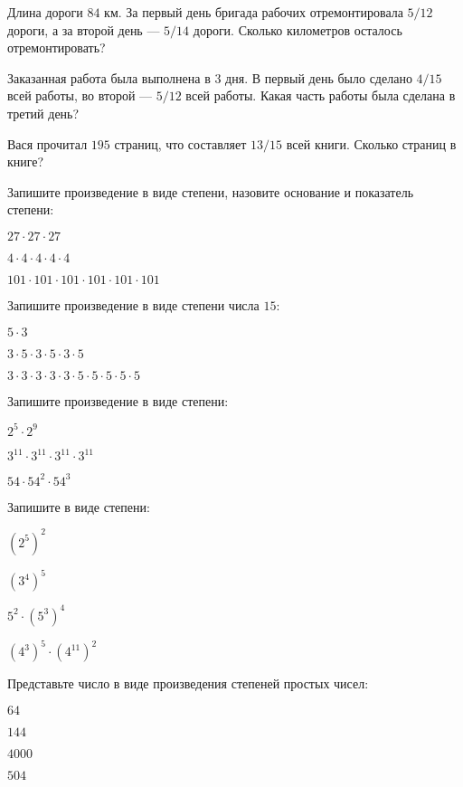 \begin{listofex}
	\item Длина дороги \( 84 \) км. За первый день бригада рабочих отремонтировала \( 5/12 \) дороги, а за второй день --- \( 5/14 \) дороги. Сколько километров осталось отремонтировать?
	\item Заказанная работа была выполнена в \( 3 \) дня. В первый день было сделано \( 4/15 \) всей работы, во второй --- \( 5/12 \) всей работы. Какая часть работы была сделана в третий день?
	\item Вася прочитал \( 195 \) страниц, что составляет \( 13/15 \) всей книги. Сколько страниц в книге?
	\item Запишите произведение в виде степени, назовите основание и показатель степени:
	\begin{enumcols}[itemcolumns=3]
		\item \( 27\cdot27\cdot27 \)
		\item \( 4\cdot4\cdot4\cdot4\cdot4 \)
		\item \( 101\cdot101\cdot101\cdot101\cdot101\cdot101 \)
	\end{enumcols}
	\item Запишите произведение в виде степени числа \( 15 \):
	\begin{enumcols}[itemcolumns=3]
		\item \( 5\cdot3 \)
		\item \( 3\cdot5\cdot3\cdot5\cdot3\cdot5 \)
		\item \( 3\cdot3\cdot3\cdot3\cdot3\cdot5\cdot5\cdot5\cdot5\cdot5 \)
	\end{enumcols}
	\item Запишите произведение в виде степени:
	\begin{enumcols}[itemcolumns=3]
		\item \( 2^5\cdot2^9 \)
		\item \( 3^{11}\cdot3^{11}\cdot3^{11}\cdot3^{11} \)
		\item \( 54\cdot54^2\cdot54^3 \)
	\end{enumcols}
	\item Запишите в виде степени:
	\begin{enumcols}[itemcolumns=4]
		\item \( (2^5)^2 \)
		\item \( (3^4)^5 \)
		\item \( 5^2\cdot(5^3)^4 \)
		\item \( (4^3)^5\cdot(4^11)^2 \)
	\end{enumcols}
	\item Представьте число в виде произведения степеней простых чисел:
	\begin{enumcols}[itemcolumns=4]
		\item \( 64 \)
		\item \( 144 \)
		\item \( 4000 \)
		\item \( 504 \)
	\end{enumcols}
\end{listofex}
